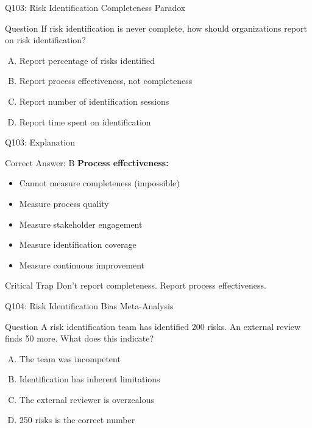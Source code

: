 \documentclass{beamer}
\begin{document}
	\begin{frame}{Q103: Risk Identification Completeness Paradox}
		\begin{block}{Question}
			If risk identification is never complete, how should organizations report on risk identification?
		\end{block}
		\begin{enumerate}[(A)]
			\item Report percentage of risks identified
			\item Report process effectiveness, not completeness
			\item Report number of identification sessions
			\item Report time spent on identification
		\end{enumerate}
	\end{frame}
	
	\begin{frame}{Q103: Explanation}
		\begin{block}{Correct Answer: B}
			\textbf{Process effectiveness:}
			\begin{itemize}
				\item Cannot measure completeness (impossible)
				\item Measure process quality
				\item Measure stakeholder engagement
				\item Measure identification coverage
				\item Measure continuous improvement
			\end{itemize}
		\end{block}
		\begin{alertblock}{Critical Trap}
			Don't report completeness. Report process effectiveness.
		\end{alertblock}
	\end{frame}
	
	\begin{frame}{Q104: Risk Identification Bias Meta-Analysis}
		\begin{block}{Question}
			A risk identification team has identified 200 risks. An external review finds 50 more. What does this indicate?
		\end{block}
		\begin{enumerate}[(A)]
			\item The team was incompetent
			\item Identification has inherent limitations
			\item The external reviewer is overzealous
			\item 250 risks is the correct number
		\end{enumerate}
	\end{frame}
	
\end{document}
